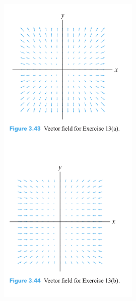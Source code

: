 \documentclass[12pt,letterpaper]{hmcpset}
\begin{document}
\begin{figure}[h]
  \begin{minipage}{0.49\textwidth}
  \centering
    \includegraphics[width=0.6\textwidth]{assets/11_1.png}
  \end{minipage}
  \begin{minipage}{0.49\textwidth}
    \centering

\end{minipage}
\end{figure}
\end{document}
